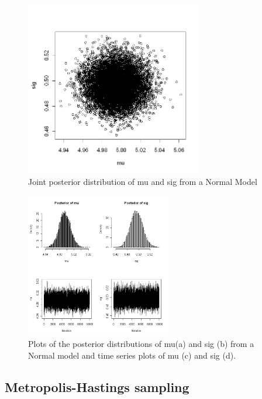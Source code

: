 \begin{figure}
\begin{center}
\includegraphics[height=3in]{figs/postdist}
\end{center}
\caption{Joint posterior distribution of mu and sig from a Normal Model}
\label{postdist.fig}
\end{figure}

\begin{figure}
\begin{center}
\includegraphics[width=2.5in]{figs/plotsofPD}
\end{center}
\caption{Plots of the posterior distributions of mu(a) and sig (b)
  from a Normal model and time series plots of mu (c) and sig (d).}
\label{plotsofPD.fig}
\end{figure}

\subsection{ Metropolis-Hastings sampling   }

